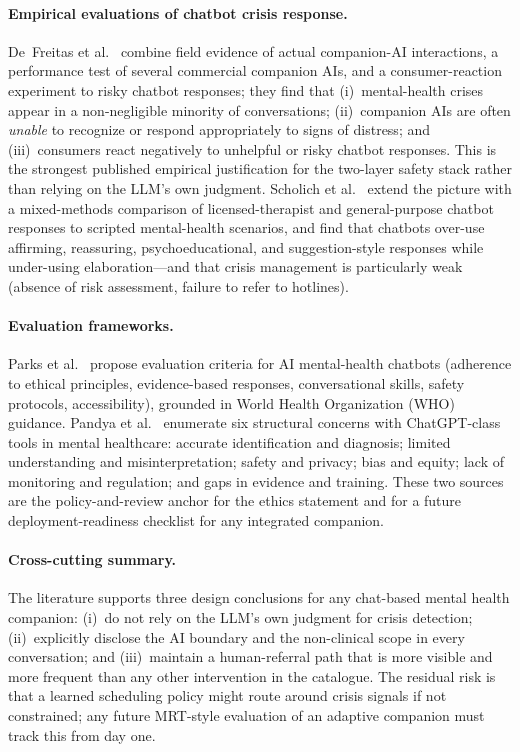\documentclass[11pt,a4paper]{article}
\begin{document}
\paragraph{Empirical evaluations of chatbot crisis response.}
De~Freitas et al.~\cite{DeFreitas2024ChatbotSafety} combine field
evidence of actual companion-AI interactions, a performance test of
several commercial companion AIs, and a consumer-reaction
experiment to risky chatbot responses; they find that
(i)~mental-health crises appear in a non-negligible minority of
conversations; (ii)~companion AIs are often \emph{unable} to
recognize or respond appropriately to signs of distress; and
(iii)~consumers react negatively to unhelpful or risky chatbot
responses. This is the strongest published empirical justification
for the two-layer safety stack rather than relying on the LLM's own
judgment. Scholich et al.~\cite{Scholich2025TherapistVsChatbot}
extend the picture with a mixed-methods comparison of
licensed-therapist and general-purpose chatbot responses to
scripted mental-health scenarios, and find that chatbots over-use
affirming, reassuring, psychoeducational, and suggestion-style
responses while under-using elaboration---and that crisis
management is particularly weak (absence of risk assessment,
failure to refer to hotlines).

\paragraph{Evaluation frameworks.}
Parks et al.~\cite{Parks2025CriticalEval} propose evaluation
criteria for AI mental-health chatbots (adherence to ethical
principles, evidence-based responses, conversational skills, safety
protocols, accessibility), grounded in World Health Organization
(WHO) guidance. Pandya et al.~\cite{Pandya2024ChatGPTMHReality}
enumerate six structural concerns with ChatGPT-class tools in
mental healthcare: accurate identification and diagnosis; limited
understanding and misinterpretation; safety and privacy; bias and
equity; lack of monitoring and regulation; and gaps in evidence
and training. These two sources are the policy-and-review anchor
for the ethics statement and for a future deployment-readiness
checklist for any integrated companion.

\paragraph{Cross-cutting summary.}
The literature supports three design conclusions for any
chat-based mental health companion: (i)~do not rely on the LLM's
own judgment for crisis detection; (ii)~explicitly disclose the AI
boundary and the non-clinical scope in every conversation; and
(iii)~maintain a human-referral path that is more visible and more
frequent than any other intervention in the catalogue. The residual
risk is that a learned scheduling policy might route around crisis
signals if not constrained; any future MRT-style evaluation of an
adaptive companion must track this from day one.
\end{document}

